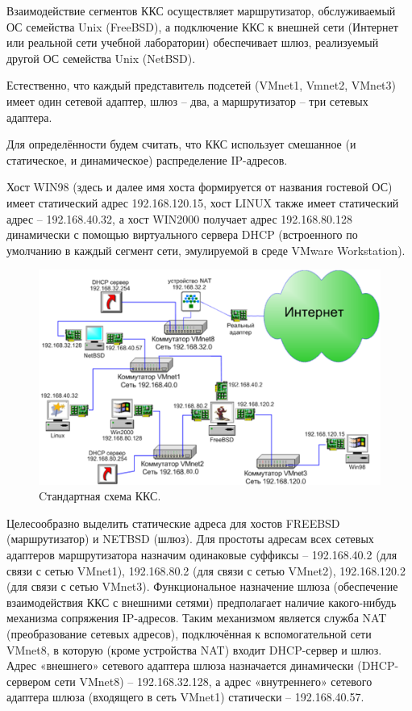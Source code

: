 \documentclass[a4paper, 12pt]{article}		%
\begin{document}
Взаимодействие сегментов ККС осуществляет маршрутизатор, обслуживаемый ОС семейства Unix (FreeBSD), а подключение ККС к внешней сети (Интернет или реальной сети учебной лаборатории) обеспечивает шлюз, реализуемый другой ОС семейства Unix (NetBSD).

Естественно, что каждый представитель подсетей (VMnet1, Vmnet2, VMnet3) имеет один сетевой адаптер, шлюз – два, а маршрутизатор – три сетевых адаптера.

Для определённости будем считать, что ККС использует смешанное (и статическое, и динамическое) распределение IP-адресов. 

Хост WIN98 (здесь и далее имя хоста формируется от названия гостевой ОС) имеет статический адрес 192.168.120.15, хост LINUX также имеет статический адрес – 192.168.40.32, а хост WIN2000 получает адрес 192.168.80.128 динамически с помощью виртуального сервера DHCP (встроенного по умолчанию в каждый сегмент сети, эмулируемой в среде VMware Workstation).

\begin{figure}[h!]
\centering
\includegraphics[scale=1]{res/network_general2}
\caption{Cтандартная схема ККС.}
\end{figure}

Целесообразно выделить статические адреса для хостов FREEBSD (маршрутизатор) и NETBSD (шлюз). Для простоты адресам всех сетевых адаптеров маршрутизатора назначим одинаковые суффиксы – 192.168.40.2 (для связи с сетью VMnet1), 192.168.80.2 (для связи с сетью VMnet2), 192.168.120.2 (для связи с сетью VMnet3). Функциональное назначение шлюза (обеспечение взаимодействия ККС с внешними сетями) предполагает наличие какого-нибудь механизма сопряжения IP-адресов. Таким механизмом является служба NAT (преобразование сетевых адресов), подключённая к вспомогательной сети VMnet8, в которую (кроме устройства NAT) входит DHCP-сервер и шлюз. Адрес «внешнего» сетевого адаптера шлюза назначается динамически (DHCP-сервером сети VMnet8) – 192.168.32.128, а  адрес «внутреннего» сетевого адаптера шлюза (входящего в сеть VMnet1) статически – 192.168.40.57.
\end{document}
